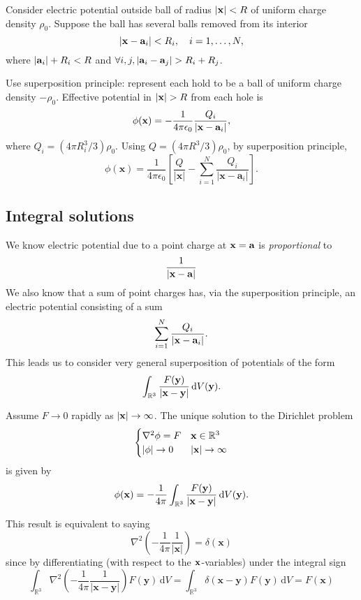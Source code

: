 \begin{example}
    Consider electric potential outside ball of radius $ |{\bf x}|<R $ of uniform charge density $ \rho_0 $. Suppose the ball has several balls removed from its interior
    \[
        |{\bf x}-{\bf a}_i|<R_i,\quad i=1,\dots,N,
    \]
    where $ |{\bf a}_i|+R_i<R $ and $ \forall i,j, |\bfa_i-\bfa_j|>R_i+R_j $.

    Use superposition principle: represent each hold to be a ball of uniform charge density $ -\rho_0 $. Effective potential in $ |\bfx|>R $ from each hole is 
    \[
        \phi({\bf x}) = -\frac{1}{4\pi \epsilon_0}\frac{Q_i}{|{\bf x}-{\bf a}_i|},
    \]
    where $Q_{i}=\left(4 \pi R_{i}^{3} / 3\right) \rho_{0}$. Using $ Q=\left(4 \pi R^{3} / 3\right) \rho_{0} $, by superposition principle, 
    \[
        \phi(\mathbf{x})=\frac{1}{4 \pi \epsilon_{0}}\left[\frac{Q}{|\mathbf{x}|}-\sum_{i=1}^{N} \frac{Q_{i}}{\left|\mathbf{x}-\mathbf{a}_{i}\right|}\right].
    \]
\end{example}

\subsection{Integral solutions}
We know electric potential due to a point charge at $ {\bf x}={\bf a} $ is \textit{proportional} to 
\[
    \frac{1}{|{\bf x}-{\bf a}|}
\]
We also know that a sum of point charges has, via the superposition principle, an electric potential consisting of a sum
\[
    \sum_{i=1}^{N}\frac{Q_i}{|{\bf x}-{\bf a}_i|}.
\]
This leads us to consider very general superposition of potentials of the form
\[
    \int_{{\mathbb{R}}^3} \frac{F({\bf y})}{|{\bf x}-{\bf y}|} \,\mathrm{d}V({\bf y}).
\]
\begin{proposition}
    Assume $F\to 0$ rapidly as $ |{\bf x}|\to \infty $. The unique solution to the Dirichlet problem
    \[
        \begin{cases}
        \laplacian\phi=F &\bfx\in\bbR^3\\
        |\phi|\to 0 &|\bfx|\to \infty\\
        \end{cases} 
    \]
    is given by 
    \[
        \phi({\bf x}) = -\frac{1}{4\pi}\int_{{\mathbb{R}}^3} \frac{F({\bf y})}{|{\bf x}-{\bf y}|} \,\mathrm{d}V({\bf y}).
    \]
\end{proposition}

This result is equivalent to saying
\[
    \nabla^{2}\left(-\frac{1}{4 \pi} \frac{1}{|\mathbf{x}|}\right)=\delta(\mathbf{x})
\]
since by differentiating (with respect to the ${\bf x}$-variables) under the integral sign
\[
    \int_{\mathbb{R}^{3}} \nabla^{2}\left(-\frac{1}{4 \pi} \frac{1}{|\mathbf{x}-\mathbf{y}|}\right) F(\mathbf{y}) \,\mathrm{d} V=\int_{\mathbb{R}^{3}} \delta(\mathbf{x}-\mathbf{y}) F(\mathbf{y}) \,\mathrm{d} V=F(\mathbf{x})
\]

